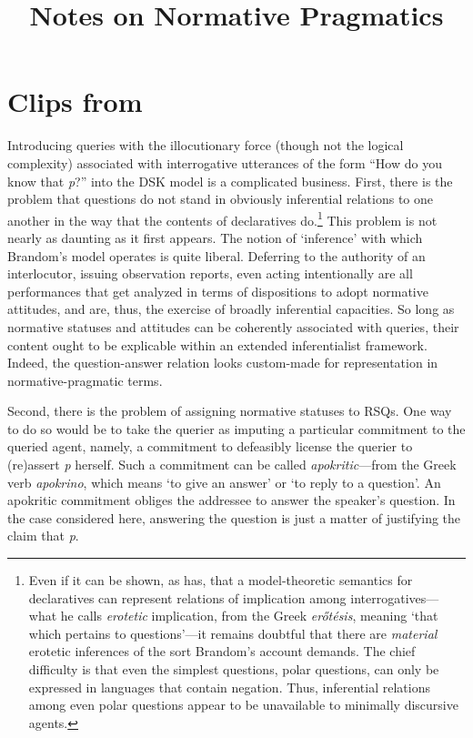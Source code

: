\documentclass{article}                     %
\begin{document}
\sloppy
\title{Notes on Normative Pragmatics}


\raggedbottom

\maketitle

\section{Clips from \citep{Millson2014a}}

Introducing queries with the illocutionary force (though not the logical complexity) associated with interrogative utterances of the form ``How do you know that \emph{p}?'' into the DSK model is a complicated business. First, there is the problem that questions do not  stand in obviously inferential relations to one another in the way that the contents of declaratives do.\footnote{Even if it can be shown, as \textcite{Wisniewski1995} has, that a model-theoretic semantics for declaratives can represent relations of implication among interrogatives---what he calls \textit{erotetic} implication, from the Greek \textit{er\H{o}t\'{e}sis}, meaning `that which pertains to questions'---it remains doubtful that there are \textit{material} erotetic inferences of the sort Brandom's account demands. The chief difficulty is that even the simplest questions, polar questions, can only be expressed in languages that contain negation. Thus, inferential relations among even polar questions appear to be unavailable to minimally discursive agents.} This problem is not nearly as daunting as it first appears. The notion of `inference' with which Brandom's model operates is quite liberal. Deferring to the authority of an interlocutor, issuing observation reports, even acting intentionally are all performances that get analyzed in terms of dispositions to adopt normative attitudes, and are, thus, the exercise of broadly inferential capacities. So long as normative statuses and attitudes can be coherently associated with queries, their content ought to be explicable within an extended inferentialist framework. Indeed, the question-answer relation looks custom-made for representation in normative-pragmatic terms.

Second, there is the problem of assigning normative statuses to RSQs. One way to do so would be to take the querier as imputing a particular commitment to the queried agent, namely, a commitment to defeasibly license the querier to (re)assert \emph{p} herself. Such a commitment can be called \emph{apokritic}---from the Greek verb \textit{apokrino}, which means `to give an answer' or `to reply to a question'. An apokritic commitment obliges the addressee to answer the speaker's question. In the case considered here, answering the question is just a matter of justifying the claim that \emph{p}.
\end{document}
